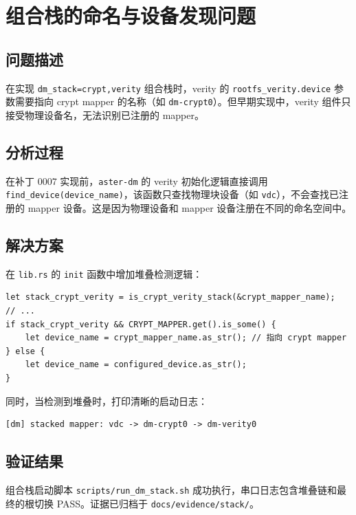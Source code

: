 \section{组合栈的命名与设备发现问题}

\subsection{问题描述}

在实现 \texttt{dm\_stack=crypt,verity} 组合栈时，verity 的 \texttt{rootfs\_verity.device} 参数需要指向 crypt mapper 的名称（如 \texttt{dm-crypt0}）。但早期实现中，verity 组件只接受物理设备名，无法识别已注册的 mapper。

\subsection{分析过程}

在补丁 0007 实现前，\texttt{aster-dm} 的 verity 初始化逻辑直接调用 \texttt{find\_device(device\_name)}，该函数只查找物理块设备（如 \texttt{vdc}），不会查找已注册的 mapper 设备。这是因为物理设备和 mapper 设备注册在不同的命名空间中。

\subsection{解决方案}

在 \texttt{lib.rs} 的 \texttt{init} 函数中增加堆叠检测逻辑：

\begin{verbatim}
let stack_crypt_verity = is_crypt_verity_stack(&crypt_mapper_name);
// ...
if stack_crypt_verity && CRYPT_MAPPER.get().is_some() {
    let device_name = crypt_mapper_name.as_str(); // 指向 crypt mapper
} else {
    let device_name = configured_device.as_str();
}
\end{verbatim}

同时，当检测到堆叠时，打印清晰的启动日志：
\begin{verbatim}
[dm] stacked mapper: vdc -> dm-crypt0 -> dm-verity0
\end{verbatim}

\subsection{验证结果}

组合栈启动脚本 \texttt{scripts/run\_dm\_stack.sh} 成功执行，串口日志包含堆叠链和最终的根切换 PASS。证据已归档于 \texttt{docs/evidence/stack/}。

